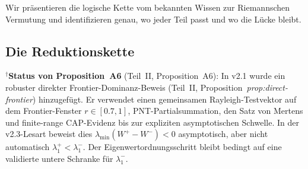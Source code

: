 \documentclass[12pt,a4paper]{article}
\theoremstyle{definition}
\theoremstyle{remark}
\begin{document}
Wir präsentieren die logische Kette vom bekannten Wissen zur Riemannschen Vermutung und identifizieren genau, wo jeder Teil passt und wo die Lücke bleibt.

\subsection{Die Reduktionskette}

\begin{center}
\renewcommand{\arraystretch}{1.3}
\end{center}

\noindent${}^\dagger$\textbf{Status von Proposition~A6} (Teil~II, Proposition~A6): In v2.1 wurde ein robuster direkter Frontier-Dominanz-Beweis (Teil~II, Proposition~\emph{prop:direct-frontier}) hinzugefügt. Er verwendet einen gemeinsamen Rayleigh-Testvektor auf dem Frontier-Fenster $r\in[0.7,1]$, PNT-Partialsummation, den Satz von Mertens und finite-range CAP-Evidenz bis zur expliziten asymptotischen Schwelle. In der v2.3-Lesart beweist dies $\lambda_{\min}(W^+-W^-)<0$ asymptotisch, aber nicht automatisch $\lambda_1^+<\lambda_1^-$. Der Eigenwertordnungsschritt bleibt bedingt auf eine validierte untere Schranke für $\lambda_1^-$.
\end{document}
